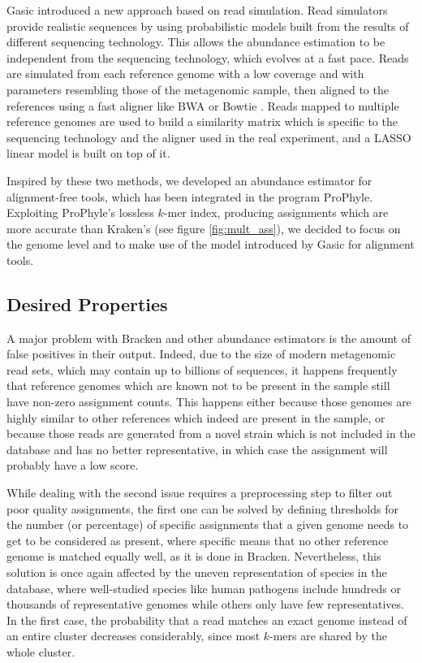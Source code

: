 Gasic \cite{lindner_metagenomic_2013} introduced a new approach based on read simulation. Read simulators provide realistic sequences by using probabilistic models built from the results of different sequencing technology. This allows the abundance estimation to be independent from the sequencing technology, which evolves at a fast pace. Reads are simulated from each reference genome with a low coverage and with parameters resembling those of the metagenomic sample, then aligned to the references using a fast aligner like BWA \cite{li_aligning_2013} or Bowtie \cite{langmead_fast_2012}. Reads mapped to multiple reference genomes are used to build a similarity matrix which is specific to the sequencing technology and the aligner used in the real experiment, and a LASSO linear model is built on top of it.

Inspired by these two methods, we developed an abundance estimator for alignment-free tools, which has been integrated in the program ProPhyle. Exploiting ProPhyle's lossless $k$-mer index, producing assignments which are more accurate than Kraken's (see figure \ref{fig:mult_ass}), we decided to focus on the genome level and to make use of the model introduced by Gasic for alignment tools.

\subsection{Desired Properties}

A major problem with Bracken and other abundance estimators is the amount of false positives in their output. Indeed, due to the size of modern metagenomic read sets, which may contain up to billions of sequences, it happens frequently that reference genomes which are known not to be present in the sample still have non-zero assignment counts. This happens either because those genomes are highly similar to other references which indeed are present in the sample, or because those reads are generated from a novel strain which is not included in the database and has no better representative, in which case the assignment will probably have a low score.

While dealing with the second issue requires a preprocessing step to filter out poor quality assignments, the first one can be solved by defining thresholds for the number (or percentage) of specific assignments that a given genome needs to get to be considered as present, where specific means that no other reference genome is matched equally well, as it is done in Bracken. Nevertheless, this solution is once again affected by the uneven representation of species in the database, where well-studied species like human pathogens include hundreds or thousands of representative genomes while others only have few representatives. In the first case, the probability that a read matches an exact genome instead of an entire cluster decreases considerably, since most $k$-mers are shared by the whole cluster.

